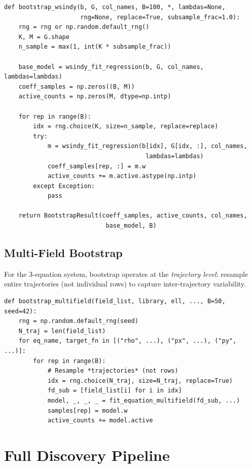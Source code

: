\documentclass[11pt]{article}
\begin{document}
\begin{lstlisting}[caption={uncertainty.py --- bootstrap\_wsindy}]
def bootstrap_wsindy(b, G, col_names, B=100, *, lambdas=None,
                     rng=None, replace=True, subsample_frac=1.0):
    rng = rng or np.random.default_rng()
    K, M = G.shape
    n_sample = max(1, int(K * subsample_frac))

    base_model = wsindy_fit_regression(b, G, col_names, lambdas=lambdas)
    coeff_samples = np.zeros((B, M))
    active_counts = np.zeros(M, dtype=np.intp)

    for rep in range(B):
        idx = rng.choice(K, size=n_sample, replace=replace)
        try:
            m = wsindy_fit_regression(b[idx], G[idx, :], col_names,
                                       lambdas=lambdas)
            coeff_samples[rep, :] = m.w
            active_counts += m.active.astype(np.intp)
        except Exception:
            pass

    return BootstrapResult(coeff_samples, active_counts, col_names,
                            base_model, B)
\end{lstlisting}


\subsection{Multi-Field Bootstrap}

For the 3-equation system, bootstrap operates at the \emph{trajectory
level}: resample entire trajectories (not individual rows) to capture
inter-trajectory variability.

\begin{lstlisting}[caption={multifield.py --- bootstrap\_multifield}]
def bootstrap_multifield(field_list, library, ell, ..., B=50, seed=42):
    rng = np.random.default_rng(seed)
    N_traj = len(field_list)
    for eq_name, target_fn in [("rho", ...), ("px", ...), ("py", ...)]:
        for rep in range(B):
            # Resample *trajectories* (not rows)
            idx = rng.choice(N_traj, size=N_traj, replace=True)
            fd_sub = [field_list[i] for i in idx]
            model, _, _, _ = fit_equation_multifield(fd_sub, ...)
            samples[rep] = model.w
            active_counts += model.active
\end{lstlisting}


\section{Full Discovery Pipeline}
\label{sec:pipeline}
\end{document}
